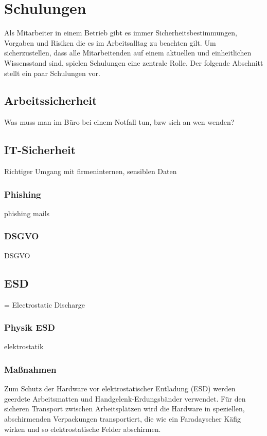 \documentclass[a4paper, 12pt]{article}
\begin{document}
\newpage
\section{Schulungen}\label{Schulungen} %
Als Mitarbeiter in einem Betrieb gibt es immer Sicherheitsbestimmungen, Vorgaben und Risiken die es im Arbeitsalltag zu beachten gilt. Um sicherzustellen, dass alle Mitarbeitenden auf einem aktuellen und einheitlichen Wissensstand sind, spielen Schulungen eine zentrale Rolle. Der folgende Abschnitt stellt ein paar Schulungen vor.

\subsection{Arbeitssicherheit}\label{Arbeitssicherheit}
Was muss man im Büro bei einem Notfall tun, bzw sich an wen wenden?

\subsection{IT-Sicherheit}\label{IT-Sicherheit}
Richtiger Umgang mit firmeninternen, sensiblen Daten

\subsubsection{Phishing}\label{Phishing}
phishing mails

\subsubsection{DSGVO}\label{DSGVO}
DSGVO \cite{dsgvo2024}

\subsection{ESD}\label{ESD}
= Electrostatic Discharge

\subsubsection{Physik ESD}\label{physik_esd}
elektrostatik

\subsubsection{Maßnahmen}\label{measurements_esd}
Zum Schutz der Hardware vor elektrostatischer Entladung (ESD) werden geerdete Arbeitsmatten und Handgelenk-Erdungsbänder verwendet. Für den sicheren Transport zwischen Arbeitsplätzen wird die Hardware in speziellen, abschirmenden Verpackungen transportiert, die wie ein Faradayscher Käfig wirken und so elektrostatische Felder abschirmen.
\end{document}
